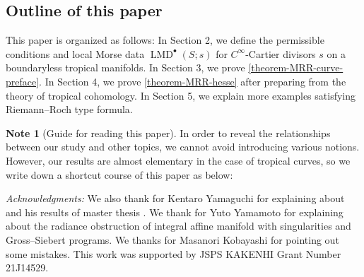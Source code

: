 \documentclass[a4paper,dvipdfmx,reqno,12pt]{amsart}
\theoremstyle{definition}
\newtheorem{Note}[theorem]{Note}
\newcommand{\opn}[1]{\operatorname{#1}}
\numberwithin{equation}{section}
\begin{document}
\subsection{Outline of this paper}

This paper is organized as follows:
In Section 2, we define the permissible conditions 
and local Morse data $\opn{LMD}^{\bullet}(S;s)$ for 
$C^{\infty}$-Cartier divisors $s$ on a boundaryless
tropical manifolds.
In Section 3, we prove 
\cref{theorem-MRR-curve-preface}.
In Section 4, we prove 
\cref{theorem-MRR-hesse} after preparing from 
the theory of tropical cohomology.
In Section 5, we explain 
more examples satisfying Riemann--Roch type 
formula.

\begin{Note}[Guide for reading this paper]
  In order to reveal the relationships between our study
  and other topics, we cannot avoid introducing various
  notions. However, our results are almost elementary
in the case of tropical curves,
  so we write down a shortcut course of this paper as below:
\end{Note}

\textit{Acknowledgments:}
We also thank for Kentaro Yamaguchi for explaining about
\cite{MR4234675} and his results of master thesis 
\cite{yamaguchimaster}. We thank for Yuto Yamamoto for
explaining about the radiance obstruction of integral 
affine manifold with singularities and Gross--Siebert
programs. We thanks for Masanori Kobayashi for 
pointing out some mistakes. 
This work was supported by JSPS KAKENHI 
Grant Number 21J14529.
\end{document}
